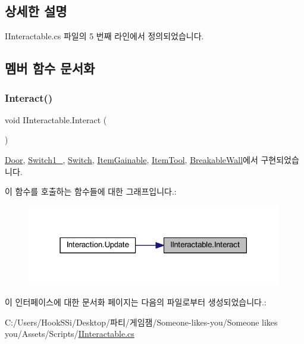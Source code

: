 \subsection{상세한 설명}


I\+Interactable.\+cs 파일의 5 번째 라인에서 정의되었습니다.



\subsection{멤버 함수 문서화}
\mbox{\label{interface_i_interactable_a6e8c9bc1f27bc2a5c81f674ceeac024c}} 
\subsubsection{\texorpdfstring{Interact()}{Interact()}}
{\footnotesize\ttfamily void I\+Interactable.\+Interact (\begin{DoxyParamCaption}{ }\end{DoxyParamCaption})}



\mbox{\hyperlink{class_door_af8fed06499c3e6ffe6d993b5b341c54f}{Door}}, \mbox{\hyperlink{class_switch1__1_a7a6f57395627e79c54aadef96b614673}{Switch1\+\_}}, \mbox{\hyperlink{class_switch_ae6359a4d03949a03a05f119273778e08}{Switch}}, \mbox{\hyperlink{class_item_gainable_a693eecdbed67e3edfcbd838f1496095c}{Item\+Gainable}}, \mbox{\hyperlink{class_item_tool_aaf220012be263b22a8834bf48d6a032c}{Item\+Tool}}, \mbox{\hyperlink{class_breakable_wall_a73879db8dcfdfbc659cbb25a29886c11}{Breakable\+Wall}}에서 구현되었습니다.

이 함수를 호출하는 함수들에 대한 그래프입니다.\+:\nopagebreak
\begin{figure}[H]
\begin{center}
\leavevmode
\includegraphics[width=315pt]{d2/df1/interface_i_interactable_a6e8c9bc1f27bc2a5c81f674ceeac024c_icgraph}
\end{center}
\end{figure}


이 인터페이스에 대한 문서화 페이지는 다음의 파일로부터 생성되었습니다.\+:\begin{DoxyCompactItemize}
\item 
C\+:/\+Users/\+Hook\+S\+Si/\+Desktop/파티/게임잼/\+Someone-\/likes-\/you/\+Someone likes you/\+Assets/\+Scripts/\mbox{\hyperlink{_i_interactable_8cs}{I\+Interactable.\+cs}}\end{DoxyCompactItemize}
